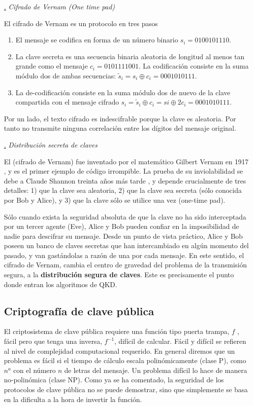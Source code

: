 \documentclass[a4paper,11pt]{book} %
\numberwithin{equation}{chapter}
\def\subsubiContadorIt{\par\addtocounter{subsubsection}{1}\underline{\it\thesubsubsection.}\hskip0.5cm \setcounter{subsubsubsectionIt}{0}}
\newcommand{\SubsubiIt}[1]{
		\subsubiContadorIt \textit{#1}
	}
\newcounter{subsubsubsectionIt}[subsubsection]
\begin{document}
			\SubsubiIt{Cifrado de Vernam (One time pad)}

El cifrado de Vernam es un protocolo en tres pasos
\begin{enumerate}
	\item El mensaje se codifica en forma de un número binario $s_i = 0100101110$.
	\item La clave secreta es una secuencia binaria aleatoria de longitud al menos tan grande como el mensaje $c_i = 0101111001$. La codificación consiste en la suma módulo dos de ambas secuencias: 
	$\tilde{s}_i = s_i \oplus c_i = 0001010111$.
	\item La de-codificación consiste en la suma módulo dos de nuevo de la clave compartida con el mensaje cifrado $s_i = \tilde{s}_i \oplus c_i = si \oplus 2c_i = 0001010111$.
\end{enumerate}
Por un lado, el texto cifrado es indescifrable porque la clave es aleatoria. Por tanto no transmite ninguna correlación entre los dígitos del mensaje original.

			\SubsubiIt{Distribución secreta de claves}
			
El (cifrado de Vernam) fue inventado por el matemático Gilbert Vernam en 1917 \cite{bib_Vernam-1926}, y es el primer ejemplo
de código irrompible. La prueba de su inviolabilidad se debe a Claude Shannon treinta años más tarde \cite{bib_Shannon-1949},
y depende crucialmente de tres detalles: 1) que la clave sea aleatoria, 2) que la clave sea secreta (sólo
conocida por Bob y Alice), y 3) que la clave sólo se utilice una vez (one-time pad).

Sólo cuando exista la seguridad absoluta de que la clave no ha sido interceptada por un tercer agente
(Eve), Alice y Bob pueden confiar en la imposibilidad de nadie para descifrar su mensaje. Desde un
punto de vista práctico, Alice y Bob poseen un banco de claves secretas que han intercambiado en algún
momento del pasado, y van gastándolas a razón de una por cada mensaje. En este sentido, el cifrado de
Vernam, cambia el centro de gravedad del problema de la transmisión segura, a la \textbf{distribución segura de
claves}. Este es precisamente el punto donde entran los algoritmos de QKD.


		\subsection{Criptografía de clave pública}

	El criptosistema de clave pública requiere una función tipo puerta trampa, $f$ , fácil pero que tenga una inversa, $f^{-1}$, difícil de calcular. Fácil y difícil se refieren al nivel de complejidad computacional requerido. En general diremos que un problema es fácil si el tiempo de cálculo escala polinómicamente (clase P), como $n^a$ con el número $n$ de letras del mensaje. Un problema difícil lo hace de manera no-polinómica (clase NP). Como ya se ha comentado, la seguridad de los protocolos de clave pública no se puede demostrar, sino que simplemente se basa en la dificulta a la hora de invertir la función. 
	
\end{document}
